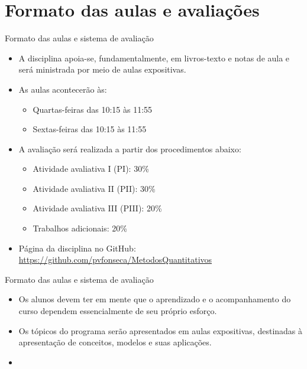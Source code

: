 \documentclass[10pt]{beamer}
\begin{document}
\section{Formato das aulas e avaliações}
\begin{frame}{Formato das aulas e sistema de avaliação}
    \begin{itemize}
        \item A disciplina apoia-se, fundamentalmente, em livros-texto e notas de aula e será ministrada por meio de aulas expositivas.\bigskip

        \item As aulas acontecerão às:
              \begin{itemize}
                  \item Quartas-feiras das 10:15 às 11:55
                  \item Sextas-feiras das 10:15 às 11:55\bigskip
              \end{itemize}

        \item A avaliação será realizada a partir dos procedimentos abaixo:
              \begin{itemize}
                  \item Atividade avaliativa I (PI): 30\%
                  \item Atividade avaliativa II (PII): 30\%
                  \item Atividade avaliativa III (PIII): 20\%
                  \item Trabalhos adicionais: 20\%\bigskip
              \end{itemize}

        \item Página da disciplina no GitHub: \href{github.com/pvfonseca/MetodosQuantitativos}{https://github.com/pvfonseca/MetodosQuantitativos}
    \end{itemize}
\end{frame}

\begin{frame}{Formato das aulas e sistema de avaliação}
    \begin{itemize}
        \item Os alunos devem ter em mente que o aprendizado e o acompanhamento do curso dependem essencialmente de seu próprio esforço.\bigskip

        \item Os tópicos do programa serão apresentados em aulas expositivas, destinadas à apresentação de conceitos, modelos e suas aplicações.\bigskip

        \item[\emoji{warning}] 
    \end{itemize}

\end{frame}
\end{document}
